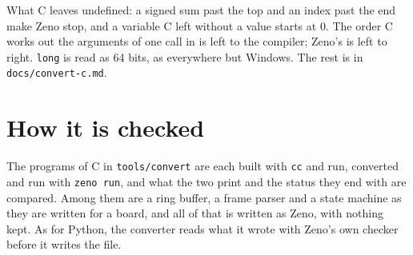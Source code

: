 What C leaves undefined: a signed sum past the top and an index past
the end make Zeno stop, and a variable C left without a value starts
at 0. The order C works out the arguments of one call in is left to
the compiler; Zeno's is left to right. \verb|long| is read as 64 bits,
as everywhere but Windows. The rest is in \verb|docs/convert-c.md|.

\section{How it is checked}

The programs of C in \verb|tools/convert| are each built with
\verb|cc| and run, converted and run with \verb|zeno run|, and what the
two print and the status they end with are compared. Among them are a
ring buffer, a frame parser and a state machine as they are written
for a board, and all of that is written as Zeno, with nothing kept.
As for Python, the converter reads what it wrote with Zeno's own
checker before it writes the file.
